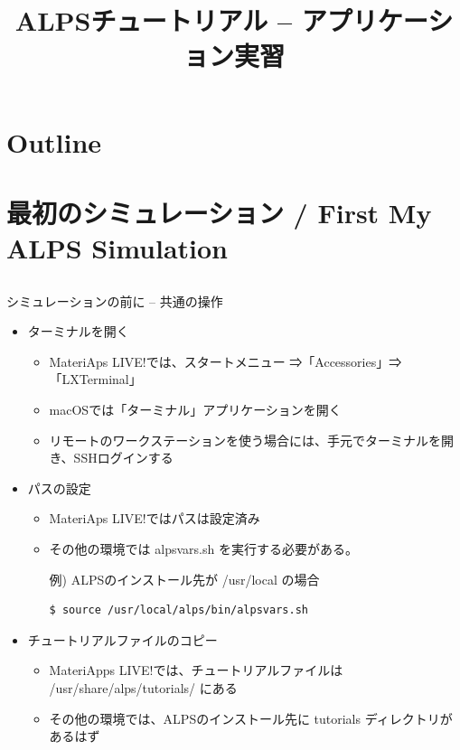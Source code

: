 
\title{ALPSチュートリアル -- アプリケーション実習}




\begin{frame}
  \titlepage
\end{frame}

\section*{Outline}
\begin{frame}[t,fragile]
   \tableofcontents
\end{frame}

\section{最初のシミュレーション / First My ALPS Simulation}
\subsection*{\redb\whiteb\greenm}

\begin{frame}[t,fragile]{シミュレーションの前に -- 共通の操作}
  \begin{itemize}
  \item ターミナルを開く
    \begin{itemize}
    \item MateriAps LIVE!では、スタートメニュー ⇒「Accessories」⇒「LXTerminal」
    \item macOSでは「ターミナル」アプリケーションを開く
    \item リモートのワークステーションを使う場合には、手元でターミナルを開き、SSHログインする
    \end{itemize}

  \item パスの設定
    \begin{itemize}
    \item MateriAps LIVE!ではパスは設定済み
    \item その他の環境では alpsvars.sh を実行する必要がある。

      例) ALPSのインストール先が /usr/local の場合
\begin{lstlisting}
$ source /usr/local/alps/bin/alpsvars.sh
\end{lstlisting}
    \end{itemize}
    
  \item チュートリアルファイルのコピー
    \begin{itemize}
    \item MateriApps LIVE!では、チュートリアルファイルは /usr/share/alps/tutorials/ にある
    \item その他の環境では、ALPSのインストール先に tutorials ディレクトリがあるはず
    \end{itemize}
  \end{itemize}
\end{frame}

